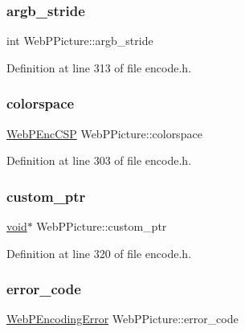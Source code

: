 \subsubsection{\texorpdfstring{argb\_stride}{argb\_stride}}
{\footnotesize\ttfamily int Web\+P\+Picture\+::argb\+\_\+stride}



Definition at line 313 of file encode.\+h.

\mbox{\label{struct_web_p_picture_a3da62a6144bda9f8a25c851cc3c5b8c9}} 
\subsubsection{\texorpdfstring{colorspace}{colorspace}}
{\footnotesize\ttfamily \mbox{\hyperlink{encode_8h_a40e7d92ce3a63e372e184efbcd62c925}{Web\+P\+Enc\+C\+SP}} Web\+P\+Picture\+::colorspace}



Definition at line 303 of file encode.\+h.

\mbox{\label{struct_web_p_picture_ab52a1e67bc47eb782ab846edbe9504f3}} 
\subsubsection{\texorpdfstring{custom\_ptr}{custom\_ptr}}
{\footnotesize\ttfamily \mbox{\hyperlink{_s_d_l__opengles2__gl2ext_8h_ae5d8fa23ad07c48bb609509eae494c95}{void}}$\ast$ Web\+P\+Picture\+::custom\+\_\+ptr}



Definition at line 320 of file encode.\+h.

\mbox{\label{struct_web_p_picture_a9bea0d4fcc23a950e4d40f980b7a4b45}} 
\subsubsection{\texorpdfstring{error\_code}{error\_code}}
{\footnotesize\ttfamily \mbox{\hyperlink{encode_8h_ac00eb4f74182805d226941f19df60243}{Web\+P\+Encoding\+Error}} Web\+P\+Picture\+::error\+\_\+code}



